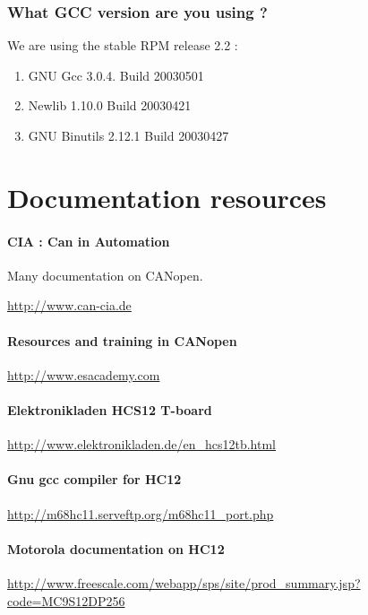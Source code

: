 \documentclass[12pt,twoside]{article}
\newcommand\liststyleLxiii{%
\renewcommand\labelitemi{{\textbullet}}
\renewcommand\labelitemii{{\textbullet}}
\renewcommand\labelitemiii{{\textbullet}}
\renewcommand\labelitemiv{{\textbullet}}
}
\begin{document}
\subsubsection{What GCC version are you using ?}
We are using the stable RPM release 2.2 :

\liststyleLxiii
\begin{enumerate}
\item GNU Gcc 3.0.4. Build 20030501
\item Newlib 1.10.0 Build 20030421
\item GNU Binutils 2.12.1 Build 20030427
\end{enumerate}
\section{Documentation resources}
\paragraph{CIA : Can in Automation}
Many documentation on CANopen.

\href{http://www.can-cia.de/}{http://www.can{}-cia.de}

\paragraph{Resources and training in CANopen}
\href{http://www.esacademy.com/}{http://www.esacademy.com}

\paragraph{Elektronikladen HCS12 T{}-board}
\href{http://www.elektronikladen.de/en_hcs12tb.html}{http://www.elektronikladen.de/en\_hcs12tb.html}

\paragraph{Gnu gcc compiler for HC12}
\href{http://m68hc11.serveftp.org/m68hc11_port.php}{http://m68hc11.serveftp.org/m68hc11\_port.php}

\paragraph{Motorola documentation on HC12}
\href{http://www.freescale.com/webapp/sps/site/prod_summary.jsp?code=MC9S12DP256}{http://www.freescale.com/webapp/sps/site/prod\_summary.jsp?code=MC9S12DP256}
\end{document}
